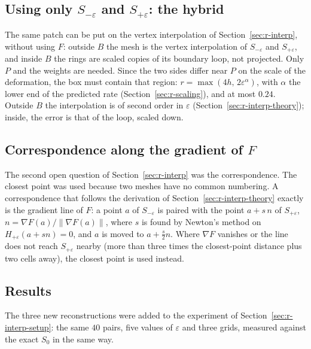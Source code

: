 \documentclass[12pt, a4paper]{article}
\theoremstyle{plain}
\theoremstyle{definition}
\theoremstyle{remark}
\theoremstyle{definition}
\begin{document}
\subsection{Using only $S_{-\varepsilon}$ and $S_{+\varepsilon}$: the hybrid}
\label{sec:r-cone-hybrid}

The same patch can be put on the vertex interpolation of Section~\ref{sec:r-interp},
without using $F$: outside $B$ the mesh is the vertex interpolation of
$S_{-\varepsilon}$ and $S_{+\varepsilon}$, and inside $B$ the rings are scaled copies of
its boundary loop, not projected. Only $P$ and the weights are needed. Since the two
sides differ near $P$ on the scale of the deformation, the box must contain that
region: $r=\max(4h,\,2\varepsilon^{\alpha})$, with $\alpha$ the lower end of the
predicted rate (Section~\ref{sec:r-scaling}), and at most $0.24$. Outside $B$ the
interpolation is of second order in $\varepsilon$
(Section~\ref{sec:r-interp-theory}); inside, the error is that of the loop, scaled
down.

\subsection{Correspondence along the gradient of $F$}
\label{sec:r-cone-normal}

The second open question of Section~\ref{sec:r-interp} was the correspondence. The
closest point was used because two meshes have no common numbering. A
correspondence that follows the derivation of Section~\ref{sec:r-interp-theory}
exactly is the gradient line of $F$: a point $a$ of $S_{-\varepsilon}$ is paired with
the point $a+s\,n$ of $S_{+\varepsilon}$, $n=\nabla F(a)/\|\nabla F(a)\|$, where $s$ is
found by Newton's method on $H_{+\varepsilon}(a+sn)=0$, and $a$ is moved to
$a+\tfrac s2n$. Where $\nabla F$ vanishes or the line does not reach
$S_{+\varepsilon}$ nearby (more than three times the closest-point distance plus two
cells away), the closest point is used instead.

\subsection{Results}
\label{sec:r-cone-results}

The three new reconstructions were added to the experiment of
Section~\ref{sec:r-interp-setup}: the same $40$ pairs, five values of $\varepsilon$
and three grids, measured against the exact $S_0$ in the same way.
\end{document}
